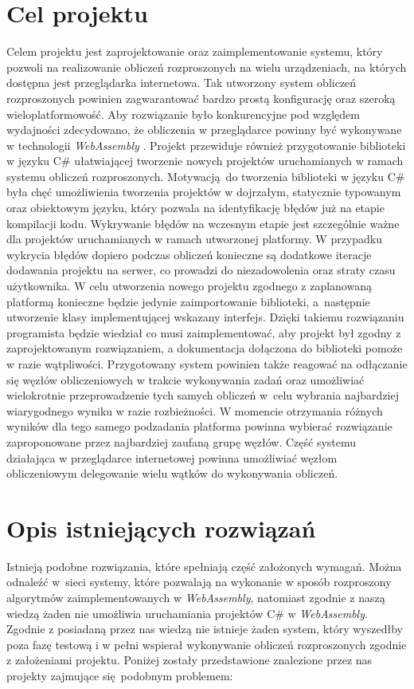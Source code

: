 \documentclass[a4paper,11pt,twoside]{report}
\theoremstyle{definition}
\begin{document}
    \section{Cel projektu}
        Celem projektu jest zaprojektowanie oraz zaimplementowanie systemu, który pozwoli na realizowanie obliczeń rozproszonych na wielu urządzeniach, na których dostępna jest przeglądarka internetowa.
        Tak utworzony system obliczeń rozproszonych powinien zagwarantować bardzo prostą konfigurację oraz szeroką wieloplatformowość.
        Aby rozwiązanie było konkurencyjne pod względem wydajności zdecydowano, że obliczenia w przeglądarce powinny być wykonywane w technologii \textit{WebAssembly} \cite{webassembly}.
        Projekt przewiduje również przygotowanie biblioteki w języku C\# ułatwiającej tworzenie nowych projektów uruchamianych w ramach systemu obliczeń rozproszonych. 
        Motywacją do tworzenia biblioteki w języku C\# była chęć umożliwienia tworzenia projektów w dojrzałym, statycznie typowanym oraz obiektowym języku, który pozwala na identyfikację błędów już na etapie kompilacji kodu. 
        Wykrywanie błędów na wczesnym etapie jest szczególnie ważne dla projektów uruchamianych w ramach utworzonej platformy.
        W przypadku wykrycia błędów dopiero podczas obliczeń konieczne są dodatkowe iteracje dodawania projektu na serwer, co prowadzi do niezadowolenia oraz straty czasu użytkownika.
        W celu utworzenia nowego projektu zgodnego z zaplanowaną platformą konieczne będzie jedynie zaimportowanie biblioteki, a~następnie utworzenie klasy implementującej wskazany interfejs.
        Dzięki takiemu rozwiązaniu programista będzie wiedział co musi zaimplementować, aby projekt był zgodny z zaprojektowanym rozwiązaniem, a dokumentacja dołączona do biblioteki pomoże w razie wątpliwości.
        Przygotowany system powinien także reagować na odłączanie się węzłów obliczeniowych w trakcie wykonywania zadań oraz umożliwiać wielokrotnie przeprowadzenie tych samych obliczeń w~celu wybrania najbardziej wiarygodnego wyniku w razie rozbieżności.
        W momencie otrzymania różnych wyników dla tego samego podzadania platforma powinna wybierać rozwiązanie zaproponowane przez najbardziej zaufaną grupę węzłów.
        Część systemu działająca w przeglądarce internetowej powinna umożliwiać węzłom obliczeniowym delegowanie wielu wątków do wykonywania obliczeń.
    
    \section{Opis istniejących rozwiązań}
        Istnieją podobne rozwiązania, które spełniają część założonych wymagań.
        Można odnaleźć w~sieci systemy, które pozwalają na wykonanie w sposób rozproszony algorytmów  zaimplementowanych w \textit{WebAssembly}, natomiast zgodnie z naszą wiedzą żaden nie umożliwia uruchamiania projektów C\# w \textit{WebAssembly}.
        Zgodnie z posiadaną przez nas wiedzą nie istnieje żaden system, który wyszedłby poza fazę testową i w pełni wspierał wykonywanie obliczeń rozproszonych zgodnie z założeniami projektu.
        Poniżej zostały przedstawione znalezione przez nas projekty zajmujące się podobnym problemem:
        
\end{document}
